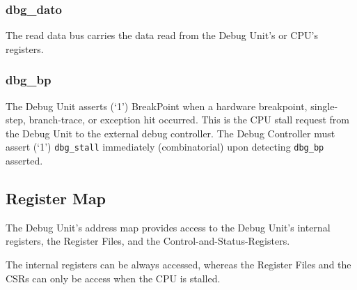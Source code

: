 \subsubsection{dbg\_dato}\label{dbg_dato}

The read data bus carries the data read from the Debug Unit's or CPU's
registers.

\subsubsection{dbg\_bp}\label{dbg_bp}

The Debug Unit asserts (`1') BreakPoint when a hardware breakpoint,
single-step, branch-trace, or exception hit occurred. This is the CPU
stall request from the Debug Unit to the external debug controller. The
Debug Controller must assert (`1') \texttt{dbg\_stall} immediately
(combinatorial) upon detecting \texttt{dbg\_bp} asserted.

\subsection{Register Map}\label{register-map}

The Debug Unit's address map provides access to the Debug Unit's
internal registers, the Register Files, and the
Control-and-Status-Registers.

The internal registers can be always accessed, whereas the Register
Files and the CSRs can only be access when the CPU is stalled.

